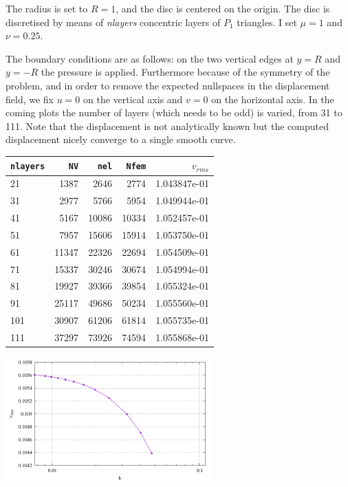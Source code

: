 The radius is set to $R=1$, and the disc is centered on the origin. The disc 
is discretised by means of {\sl nlayers} concentric layers of $P_1$ triangles.
I set $\mu=1$ and $\nu=0.25$. 

The boundary conditions are as follows: on the two vertical edges at $y=R$ and $y=-R$ 
the pressure is applied. Furthermore because of the symmetry of the problem, 
and in order to remove the expected nullspaces in the displacement field, 
we fix $u=0$ on the vertical axis and $v=0$ on the horizontal axis.
In the coming plots the number of layers (which needs to be odd) is varied, from 31 to 111.
Note that the displacement is not analytically known but the computed displacement 
nicely converge to a single smooth curve.

\begin{center}
\begin{tabular}{lrrrr}
\hline
{\tt nlayers} & {\tt NV} & {\tt nel} & {\tt Nfem} & $v_{rms}$\\
\hline
\hline
21  &  1387 &  2646 &  2774 & 1.043847e-01\\ 
31  &  2977 &  5766 &  5954 & 1.049944e-01\\
41  &  5167 & 10086 & 10334 & 1.052457e-01\\
51  &  7957 & 15606 & 15914 & 1.053750e-01\\
61  & 11347 & 22326 & 22694 & 1.054509e-01\\
71  & 15337 & 30246 & 30674 & 1.054994e-01\\
81  & 19927 & 39366 & 39854 & 1.055324e-01\\
91  & 25117 & 49686 & 50234 & 1.055560e-01\\
101 & 30907 & 61206 & 61814 & 1.055735e-01\\
111 & 37297 & 73926 & 74594 & 1.055868e-01\\
\hline
\end{tabular}

\includegraphics[width=8cm]{python_codes/fieldstone_58/experiment1/vrms}
\end{center}


